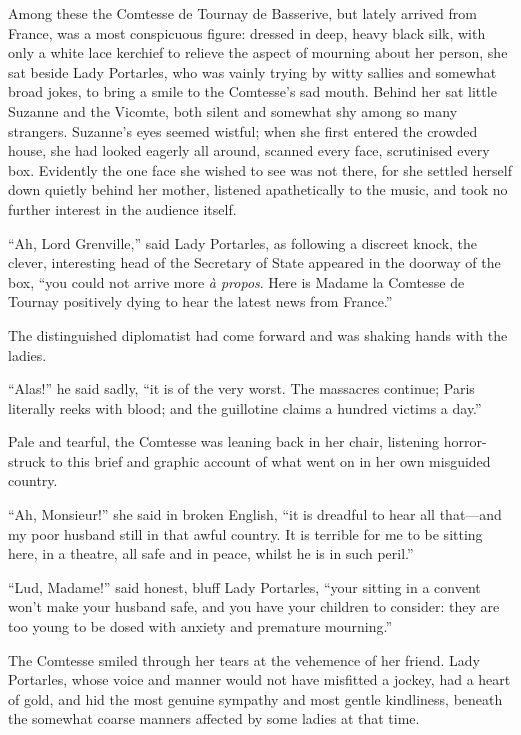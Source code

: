 Among these the Comtesse de Tournay de Basserive, but lately arrived from France, was a most conspicuous figure: dressed in deep, heavy black silk, with only a white lace kerchief to relieve the aspect of mourning about her person, she sat beside Lady Portarles, who was vainly trying by witty sallies and somewhat broad jokes, to bring a smile to the Comtesse's sad mouth. Behind her sat little Suzanne and the Vicomte, both silent and somewhat shy among so many strangers. Suzanne's eyes seemed wistful; when she first entered the crowded house, she had looked eagerly all around, scanned every face, scrutinised every box. Evidently the one face she wished to see was not there, for she settled herself down quietly behind her mother, listened apathetically to the music, and took no further interest in the audience itself.

\enquote{Ah, Lord Grenville,} said Lady Portarles, as following a discreet knock, the clever, interesting head of the Secretary of State appeared in the doorway of the box, \enquote{you could not arrive more \textit{à propos}. Here is Madame la Comtesse de Tournay positively dying to hear the latest news from France.}

The distinguished diplomatist had come forward and was shaking hands with the ladies.

\enquote{Alas!} he said sadly, \enquote{it is of the very worst. The massacres continue; Paris literally reeks with blood; and the guillotine claims a hundred victims a day.}

Pale and tearful, the Comtesse was leaning back in her chair, listening horror-struck to this brief and graphic account of what went on in her own misguided country.

\enquote{Ah, Monsieur!} she said in broken English, \enquote{it is dreadful to hear all that---and my poor husband still in that awful country. It is terrible for me to be sitting here, in a theatre, all safe and in peace, whilst he is in such peril.}

\enquote{Lud, Madame!} said honest, bluff Lady Portarles, \enquote{your sitting in a convent won't make your husband safe, and you have your children to consider: they are too young to be dosed with anxiety and premature mourning.}

The Comtesse smiled through her tears at the vehemence of her friend. Lady Portarles, whose voice and manner would not have misfitted a jockey, had a heart of gold, and hid the most genuine sympathy and most gentle kindliness, beneath the somewhat coarse manners affected by some ladies at that time.

